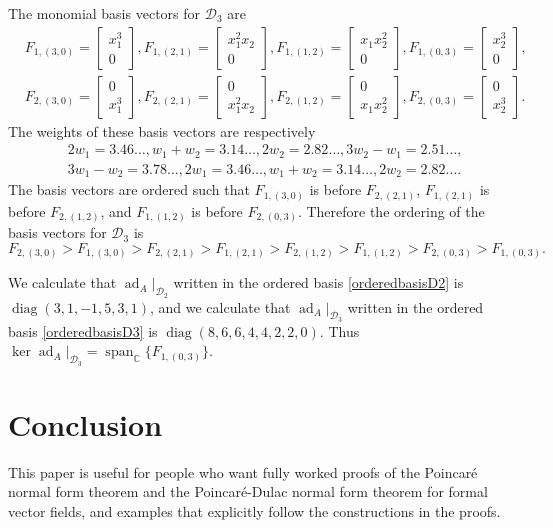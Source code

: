 \documentclass{article}
\theoremstyle{definition}
\newcommand{\diag}{\operatorname{diag}}
\newcommand{\ad}{\operatorname{ad}}
\newcommand{\spanning}{\operatorname{span}}
\begin{document}
The monomial basis vectors for $\mathscr{D}_3$ are
\[
\begin{split}
&F_{1,(3,0)}=\begin{bmatrix}x_1^3\\0\end{bmatrix},
F_{1,(2,1)}=\begin{bmatrix}x_1^2 x_2\\0\end{bmatrix},
F_{1,(1,2)}=\begin{bmatrix}x_1 x_2^2\\0\end{bmatrix},
F_{1,(0,3)}=\begin{bmatrix}x_2^3\\0\end{bmatrix},\\
&F_{2,(3,0)}=\begin{bmatrix}0\\x_1^3\end{bmatrix},
F_{2,(2,1)}=\begin{bmatrix}0\\x_1^2 x_2\end{bmatrix},
F_{2,(1,2)}=\begin{bmatrix}0\\x_1 x_2^2\end{bmatrix},
F_{2,(0,3)}=\begin{bmatrix}0\\x_2^3\end{bmatrix}.
\end{split}
\]
The weights of these basis vectors are respectively
\[
\begin{split}
&2w_1=3.46\ldots, w_1+w_2=3.14\ldots, 2w_2=2.82\ldots,3w_2-w_1=2.51\ldots,\\
&3w_1-w_2=3.78\ldots, 2w_1=3.46\ldots, w_1+w_2=3.14\ldots, 2w_2=2.82\ldots.
\end{split}
\]
The basis vectors are ordered such that $F_{1,(3,0)}$ is before $F_{2,(2,1)}$,
$F_{1,(2,1)}$ is before $F_{2,(1,2)}$, and $F_{1,(1,2)}$ is before $F_{2,(0,3)}$.
Therefore the ordering of the basis vectors for $\mathscr{D}_3$ is
\begin{equation}
\label{orderedbasisD3}
F_{2,(3,0)}>F_{1,(3,0)}>F_{2,(2,1)}>F_{1,(2,1)}>
F_{2,(1,2)}>F_{1,(1,2)}>F_{2,(0,3)}>F_{1,(0,3)}.
\end{equation}

We calculate that $\ad_A|_{\mathscr{D}_2}$ written in the ordered basis
\eqref{orderedbasisD2} is $\diag(3,1,-1,5,3,1)$, and
we calculate that
$\ad_A|_{\mathscr{D}_3}$ written in the ordered basis \eqref{orderedbasisD3} is $\diag(8,6,6,4,4,2,2,0)$.
Thus $\ker \ad_A|_{\mathscr{D}_3}=\spanning_{\mathbb{C}}\{F_{1,(0,3)}\}$.

\section{Conclusion}
This paper is useful for people who want fully worked proofs of the Poincar\'e normal form theorem and the Poincar\'e-Dulac normal form theorem for formal vector fields, and examples that explicitly follow the constructions in the proofs.




\end{document}
